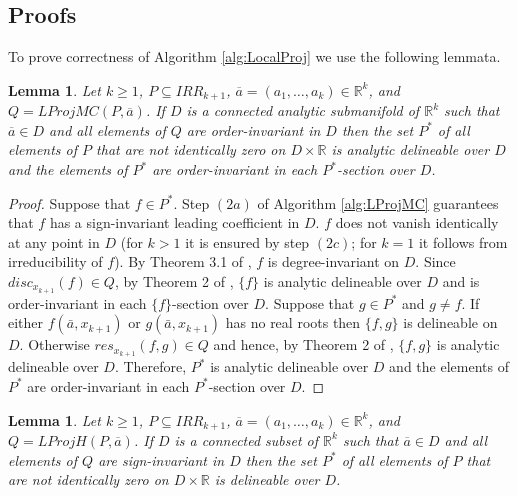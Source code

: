 \documentclass[english]{amsart}
\numberwithin{equation}{section}
\numberwithin{figure}{section}
\newtheorem{lem}[thm]{Lemma}
\begin{document}
\subsection{Proofs}

To prove correctness of Algorithm \ref{alg:LocalProj} we use the
following lemmata.
\begin{lem}
\label{lem:LProjMC}Let\emph{ $k\geq1$}\textup{\emph{,}} $P\subseteq IRR_{k+1}$\emph{,
}$\overline{a}=(a_{1},\ldots,a_{k})\in\mathbb{R}^{k}$\emph{, }\textup{\emph{and
$Q=LProjMC(P,\overline{a})$. If $D$ is}} a connected analytic submanifold
of $\mathbb{R}^{k}$ such that $\overline{a}\in D$ and all elements
of $Q$ are order-invariant in $D$ then the set $P^{*}$ of all elements
of $P$ that are not identically zero on $D\times\mathbb{R}$ is analytic
delineable over $D$ and the elements of $P^{*}$ are order-invariant
in each $P^{*}$-section over $D$. \end{lem}
\begin{proof}
Suppose that $f\in P^{*}$. Step $(2a)$ of Algorithm \ref{alg:LProjMC}
guarantees that $f$ has a sign-invariant leading coefficient in $D$.
$f$ does not vanish identically at any point in $D$ (for $k>1$
it is ensured by step $(2c)$; for $k=1$ it follows from irreducibility
of $f$). By Theorem 3.1 of \cite{B}, $f$ is degree-invariant on
$D$. Since $disc_{x_{k+1}}(f)\in Q$, by Theorem 2 of \cite{MC2},
$\{f\}$ is analytic delineable over $D$ and is order-invariant in
each $\{f\}$-section over $D$. Suppose that $g\in P^{*}$ and $g\neq f$.
If either $f(\bar{a},x_{k+1})$ or $g(\bar{a},x_{k+1})$ has no real
roots then $\{f,g\}$ is delineable on $D$. Otherwise $res_{x_{k+1}}(f,g)\in Q$
and hence, by Theorem 2 of \cite{MC2}, $\{f,g\}$ is analytic delineable
over $D$. Therefore, $P^{*}$ is analytic delineable over $D$ and
the elements of $P^{*}$ are order-invariant in each $P^{*}$-section
over $D$. \end{proof}
\begin{lem}
\label{lem:LProjH}Let\emph{ $k\geq1$}\textup{\emph{,}} $P\subseteq IRR_{k+1}$\emph{,
}$\overline{a}=(a_{1},\ldots,a_{k})\in\mathbb{R}^{k}$\emph{, }\textup{\emph{and
$Q=LProjH(P,\overline{a})$. If $D$ is}} a connected subset of $\mathbb{R}^{k}$
such that $\overline{a}\in D$ and all elements of $Q$ are sign-invariant
in $D$ then the set $P^{*}$ of all elements of $P$ that are not
identically zero on $D\times\mathbb{R}$ is delineable over $D$. \end{lem}
\end{document}
